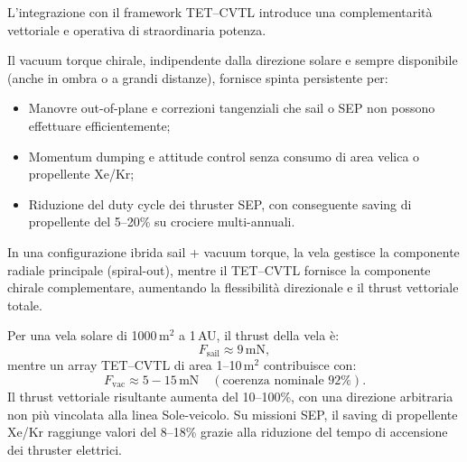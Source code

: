 \documentclass[11pt,a4paper]{article}
\theoremstyle{plain}
\theoremstyle{definition}
\begin{document}
\vspace{0.2cm}

L’integrazione con il framework TET--CVTL introduce una complementarità vettoriale e operativa di straordinaria potenza. 

\vspace{0.2cm}

Il vacuum torque chirale, indipendente dalla direzione solare e sempre disponibile (anche in ombra o a grandi distanze), fornisce spinta persistente per:

\vspace{0.1cm}
\begin{itemize}
    \item Manovre out-of-plane e correzioni tangenziali che sail o SEP non possono effettuare efficientemente;

    \vspace{0.1cm}
    \item Momentum dumping e attitude control senza consumo di area velica o propellente Xe/Kr;

    \vspace{0.1cm}
    \item Riduzione del duty cycle dei thruster SEP, con conseguente saving di propellente del 5--20\% su crociere multi-annuali.
\end{itemize}

\vspace{0.2cm}

In una configurazione ibrida sail + vacuum torque, la vela gestisce la componente radiale principale (spiral-out), mentre il TET--CVTL fornisce la componente chirale complementare, aumentando la flessibilità direzionale e il thrust vettoriale totale.

\vspace{0.2cm}

Per una vela solare di 1000\,m$^2$ a 1\,AU, il thrust della vela è:
\begin{equation}
F_{\text{sail}} \approx 9\,\text{mN},
\label{eq:thrust_sail}
\end{equation}
mentre un array TET--CVTL di area 1--10\,m$^2$ contribuisce con:
\begin{equation}
F_{\text{vac}} \approx 5 - 15\,\text{mN} \quad (\text{coerenza nominale 92\%}).
\label{eq:thrust_vac_solar}
\end{equation}
Il thrust vettoriale risultante aumenta del 10--100\%, con una direzione arbitraria non più vincolata alla linea Sole-veicolo. Su missioni SEP, il saving di propellente Xe/Kr raggiunge valori del 8--18\% grazie alla riduzione del tempo di accensione dei thruster elettrici.
\end{document}
